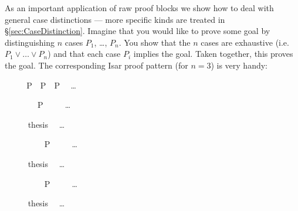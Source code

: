 \begin{isabellebody}
\begin{isamarkuptext}
As an important application of raw proof blocks we show how to deal
with general case distinctions --- more specific kinds are treated in
\S\ref{sec:CaseDistinction}. Imagine that you would like to prove some
goal by distinguishing $n$ cases $P_1$, \dots, $P_n$. You show that
the $n$ cases are exhaustive (i.e.\ $P_1 \lor \dots \lor P_n$) and
that each case $P_i$ implies the goal. Taken together, this proves the
goal. The corresponding Isar proof pattern (for $n = 3$) is very handy:%
\end{isamarkuptext}%
\isamarkuptrue%
%
\renewcommand{\isamarkupcmt}[1]{#1}
%
\isadelimproof
%
\endisadelimproof
%
\isatagproof
{}\isamarkupfalse%
\ {}\isanewline
\ \ \isamarkupfalse%
\ {}P\ {}\ P\ {}\ P\ \ %
\isamarkupcmt{\dots%
}
\isanewline
\ \ \isamarkupfalse%
\isanewline
\ \ \isamarkupfalse%
\ \isamarkupfalse%
\ P\isanewline
\ \ \ \ %
\isamarkupcmt{\dots%
}
\isanewline
\ \ \ \ \isamarkupfalse%
\ {}thesis\ \ %
\isamarkupcmt{\dots%
}
\ \isamarkupfalse%
\isanewline
\ \ \isamarkupfalse%
\isanewline
\ \ \isamarkupfalse%
\ \isamarkupfalse%
\ P\isanewline
\ \ \ \ %
\isamarkupcmt{\dots%
}
\isanewline
\ \ \ \ \isamarkupfalse%
\ {}thesis\ \ %
\isamarkupcmt{\dots%
}
\ \isamarkupfalse%
\isanewline
\ \ \isamarkupfalse%
\isanewline
\ \ \isamarkupfalse%
\ \isamarkupfalse%
\ P\isanewline
\ \ \ \ %
\isamarkupcmt{\dots%
}
\isanewline
\ \ \ \ \isamarkupfalse%
\ {}thesis\ \ %
\isamarkupcmt{\dots%
}
\ \isamarkupfalse%
\isanewline
\ \ \isamarkupfalse%

\end{isabellebody}
